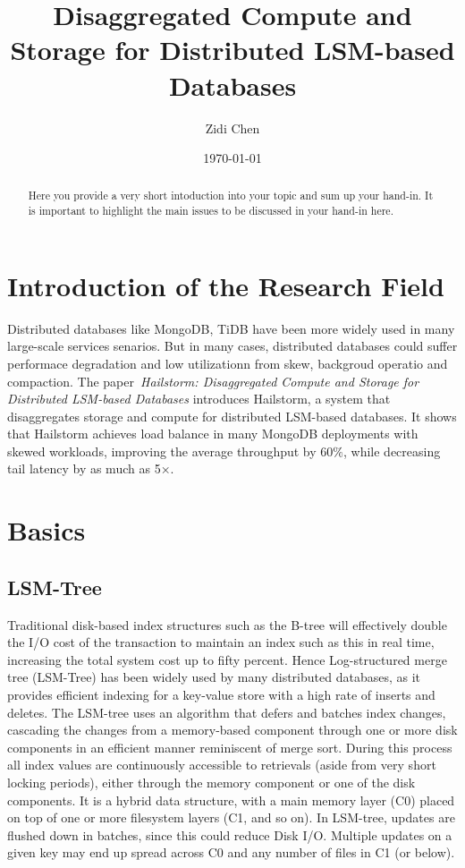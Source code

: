 \documentclass[a4paper,10pt,twoside]{article}
\title{Disaggregated Compute and Storage for Distributed LSM-based Databases}
\author{Zidi Chen}
\date{\today}
\begin{document}
\maketitle

\begin{abstract}
Here you provide a very short intoduction into your topic and sum up your hand-in. 
It is important to highlight the main issues to be discussed in your hand-in here.
\end{abstract}

\tableofcontents

\section{Introduction of the Research Field}

Distributed databases like MongoDB, TiDB have been more widely used in many large-scale services senarios.
But in many cases, distributed databases could suffer performace degradation and low utilizationn from skew, backgroud operatio and compaction.
The paper~\textit{Hailstorm: Disaggregated Compute and Storage for Distributed LSM-based Databases} \cite{mainpaper}introduces Hailstorm, a system that disaggregates storage and compute for distributed LSM-based databases.
It shows that Hailstorm achieves load balance in many MongoDB deployments with skewed workloads, improving the average throughput by 60$\%$, while decreasing tail latency by as much as 5×.


\section{Basics}

\subsection{LSM-Tree}

Traditional disk-based index structures such as the B-tree will effectively double the I/O cost of the transaction to maintain an index such as this in real time, increasing the total system cost up to fifty percent. 
Hence Log-structured merge tree (LSM-Tree) has been widely used by many distributed databases, as it provides efficient indexing for a key-value store with a high rate of inserts and deletes.
The LSM-tree uses an algorithm that defers and batches index changes, cascading the changes from a memory-based component through one or more disk components in an efficient manner reminiscent of merge sort. 
During this process all index values are continuously accessible to retrievals (aside from very short locking periods), either through the memory component or one of the disk components.
It is a hybrid data structure, with a main memory layer (C0) placed on top of one or more filesystem layers (C1, and so on). 
In LSM-tree, updates are flushed down in batches, since this could reduce Disk I/O. 
Multiple updates on a given key may end up spread across C0 and any number of files in C1 (or below). 
\end{document}
